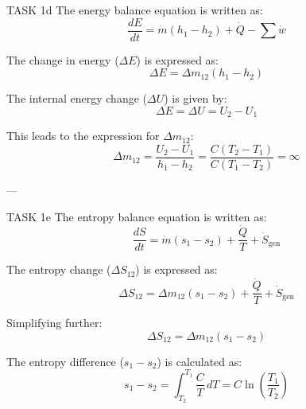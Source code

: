 TASK 1d  
The energy balance equation is written as:  
\[
\frac{dE}{dt} = \dot{m}(h_1 - h_2) + \dot{Q} - \sum \dot{w}
\]  

The change in energy (\( \Delta E \)) is expressed as:  
\[
\Delta E = \Delta m_{12}(h_1 - h_2)
\]  

The internal energy change (\( \Delta U \)) is given by:  
\[
\Delta E = \Delta U = U_2 - U_1
\]  

This leads to the expression for \( \Delta m_{12} \):  
\[
\Delta m_{12} = \frac{U_2 - U_1}{h_1 - h_2} = \frac{C(T_2 - T_1)}{C(T_1 - T_2)} = \infty
\]  

---

TASK 1e  
The entropy balance equation is written as:  
\[
\frac{dS}{dt} = \dot{m}(s_1 - s_2) + \frac{\dot{Q}}{T} + \dot{S}_{\text{gen}}
\]  

The entropy change (\( \Delta S_{12} \)) is expressed as:  
\[
\Delta S_{12} = \Delta m_{12}(s_1 - s_2) + \frac{\dot{Q}}{T} + \dot{S}_{\text{gen}}
\]  

Simplifying further:  
\[
\Delta S_{12} = \Delta m_{12}(s_1 - s_2)
\]  

The entropy difference (\( s_1 - s_2 \)) is calculated as:  
\[
s_1 - s_2 = \int_{T_2}^{T_1} \frac{C}{T} \, dT = C \ln\left(\frac{T_1}{T_2}\right)
\]  